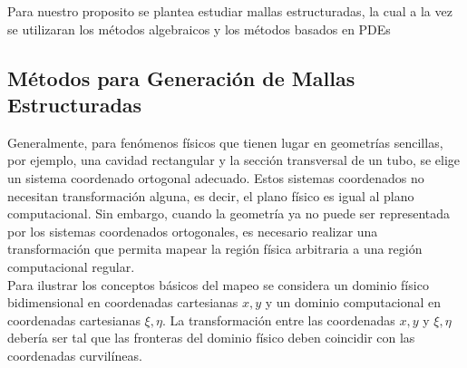 \documentclass[11pt,letterpaper]{article}
\begin{document}
Para nuestro proposito se plantea estudiar mallas estructuradas, la cual a la vez se utilizaran los m\'etodos algebraicos y los m\'etodos basados en PDEs
\\

\subsection{Métodos para Generación de Mallas Estructuradas}

Generalmente, para fen\'omenos f\'isicos que tienen lugar en geometr\'ias sencillas, por ejemplo, una cavidad rectangular y la secci\'on transversal de un tubo, se elige un sistema coordenado ortogonal adecuado. Estos sistemas coordenados no necesitan transformación alguna, es decir, el plano físico es igual al plano computacional. Sin embargo, cuando la geometría ya no puede ser representada por los sistemas coordenados ortogonales, es necesario realizar una transformaci\'on que permita mapear la regi\'on f\'isica arbitraria a una regi\'on computacional regular.\\

Para ilustrar los conceptos b\'asicos del mapeo se considera un dominio físico bidimensional en coordenadas cartesianas $x,y$ y un dominio computacional en coordenadas cartesianas $\xi,\eta$. La transformaci\'on entre las coordenadas $x,y$ y $\xi,\eta$ debería ser tal que las fronteras del dominio f\'isico deben coincidir con las coordenadas curvil\'ineas.
\end{document}
